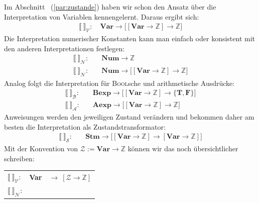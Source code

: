 \documentclass[
  a4paper,
  11pt,
]{scrartcl}
\newcommand{\Z}{\mathbb{Z}}
\newcommand{\Ac}{\mathcal{A}}
\newcommand{\Bc}{\mathcal{B}}
\newcommand{\Nc}{\mathcal{N}}
\newcommand{\Sc}{\mathcal{S}}
\newcommand{\Vc}{\mathcal{V}}
\newcommand{\Zc}{\mathcal{Z}}
\begin{document}
\begin{itemize}
    Im Abschnitt~ (\ref{par:zustande}) haben wir schon den
    Ansatz über die Interpretation von Variablen kennengelernt. Daraus ergibt
    sich:
    \begin{align*}
      \llbracket \ \rrbracket_{\Vc}: \quad
        \textbf{Var} \rightarrow
          \big[
            \left[ \textbf{Var} \rightarrow \Z \right]
            \rightarrow \Z
          \big]
    \end{align*}
    Die Interpretation numerischer Konstanten kann man einfach oder konsistent
    mit den anderen Interpretationen festlegen:
    \begin{align*}
      \llbracket \ \rrbracket_{\Nc}: \quad &
        \textbf{Num} \rightarrow \Z\\
      \llbracket \ \rrbracket_{\Nc}: \quad &
        \textbf{Num} \rightarrow
          \big[
            \left[ \textbf{Var} \rightarrow \Z \right]
            \rightarrow \Z
          \big]
    \end{align*}
    Analog folgt die Interpretation für \textsc{Bool}sche und arithmetische
    Ausdrücke:
    \begin{align*}
      \llbracket \ \rrbracket_{\Bc}: \quad &
        \textbf{Bexp} \rightarrow
          \big[
            \left[ \textbf{Var} \rightarrow \Z \right]
            \rightarrow \{ \textbf{T}, \textbf{F} \}
          \big]\\
      \llbracket \ \rrbracket_{\Ac}: \quad &
        \textbf{Aexp} \rightarrow
          \big[
            \left[ \textbf{Var} \rightarrow \Z \right]
            \rightarrow \Z
          \big]
    \end{align*}
    Anweisungen werden den jeweiligen Zustand verändern und bekommen daher am
    besten die Interpretation als Zustandstransformator:
    \begin{align*}
      \llbracket \ \rrbracket_{\Sc}: \quad &
        \textbf{Stm} \rightarrow
          \big[
            \left[ \textbf{Var} \rightarrow \Z \right]
            \rightarrow
            \left[ \textbf{Var} \rightarrow \Z \right]
          \big]
    \end{align*}
    Mit der Konvention von $\Zc := \textbf{Var} \rightarrow \Z$ können wir das
    noch übersichtlicher schreiben:
    \begin{center}
      \begin{tabular}{lll}
        $\llbracket \ \rrbracket_{\Vc}$:
        & \textbf{Var}
        & $\rightarrow \ \left[ \Zc \rightarrow \Z \right]$\\
        $\llbracket \ \rrbracket_{\Nc}$:

\end{tabular}
\end{center}
\end{itemize}
\end{document}

